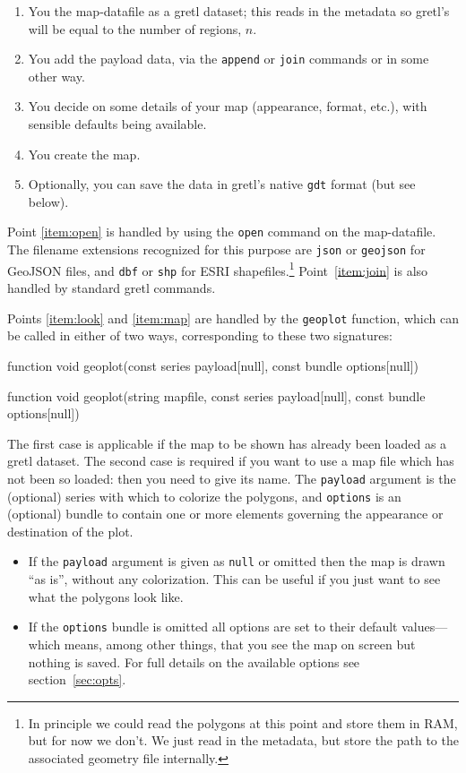 \documentclass{article}
\begin{document}
\begin{enumerate}
\item You  the map-datafile as a gretl dataset; this reads
  in the metadata so gretl's  will be equal to the number
  of regions, $n$.\label{item:open}
\item You add the payload data, via the \texttt{append} or
  \texttt{join} commands or in some other way.\label{item:join}
\item You decide on some details of your map (appearance, format,
  etc.), with sensible defaults being available.\label{item:look}
\item You create the map.\label{item:map}
\item Optionally, you can save the data in gretl's native \texttt{gdt}
  format (but see below).\label{item:save}
\end{enumerate}

Point \ref{item:open} is handled by using the \texttt{open} command on
the map-datafile. The filename extensions recognized for this purpose
are \texttt{json} or \texttt{geojson} for GeoJSON files, and
\texttt{dbf} or \texttt{shp} for ESRI shapefiles.\footnote{In
  principle we could read the polygons at this point and store them in
  RAM, but for now we don't. We just read in the metadata, but store
  the path to the associated geometry file internally.}
Point~\ref{item:join} is also handled by standard gretl commands.

Points \ref{item:look} and \ref{item:map} are handled by the
\texttt{geoplot} function, which can be called in either of two ways,
corresponding to these two signatures:
\begin{code}
function void geoplot(const series payload[null], const bundle options[null])

function void geoplot(string mapfile, const series payload[null],
                      const bundle options[null])
\end{code}
The first case is applicable if the map to be shown has already been
loaded as a gretl dataset. The second case is required if you want to
use a map file which has not been so loaded: then you need to give its
name. The \texttt{payload} argument is the (optional) series with
which to colorize the polygons, and \texttt{options} is an (optional)
bundle to contain one or more elements governing the appearance or
destination of the plot.
\begin{itemize}
\item If the \texttt{payload} argument is given as \texttt{null} or
  omitted then the map is drawn ``as is'', without any
  colorization. This can be useful if you just want to see what the
  polygons look like.
\item If the \texttt{options} bundle is omitted all options are set to
  their default values---which means, among other things, that you see
  the map on screen but nothing is saved. For full details on the
  available options see section~\ref{sec:opts}.
\end{itemize}
\end{document}
